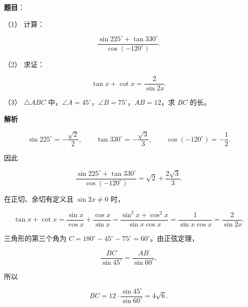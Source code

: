 \begin{answer}

\textbf{题目}：

（1） 计算：

\nopagebreak[4]
\[
\frac{\sin225^\circ+\tan330^\circ}{\cos(-120^\circ)}.
\]

（2） 求证：

\nopagebreak[4]
\[
\tan x+\cot x=\frac{2}{\sin2x}.
\]

（3） $\triangle ABC$ 中，$\angle A=45^\circ$，$\angle B=75^\circ$，$AB=12$，求 $BC$ 的长。

\textbf{解析}


\nopagebreak[4]
\[
\sin225^\circ=-\frac{\sqrt2}{2},
\qquad
\tan330^\circ=-\frac{\sqrt3}{3},
\qquad
\cos(-120^\circ)=-\frac12.
\]

因此

\nopagebreak[4]
\[
\frac{\sin225^\circ+\tan330^\circ}{\cos(-120^\circ)}
=\sqrt2+\frac{2\sqrt3}{3}.
\]


在正切、余切有定义且 $\sin2x\ne0$ 时，

\nopagebreak[4]
\[
\tan x+\cot x
=\frac{\sin x}{\cos x}+\frac{\cos x}{\sin x}
=\frac{\sin^2x+\cos^2x}{\sin x\cos x}
=\frac1{\sin x\cos x}
=\frac2{\sin2x}.
\]


三角形的第三个角为 $C=180^\circ-45^\circ-75^\circ=60^\circ$。由正弦定理，

\nopagebreak[4]
\[
\frac{BC}{\sin45^\circ}=\frac{AB}{\sin60^\circ},
\]

所以

\nopagebreak[4]
\[
BC=12\cdot\frac{\sin45^\circ}{\sin60^\circ}=4\sqrt6.
\]




\end{answer}
